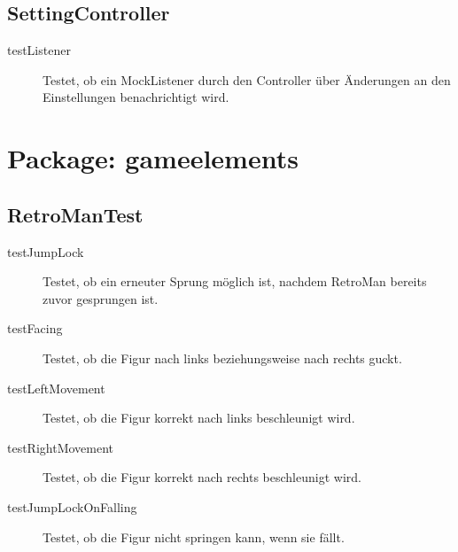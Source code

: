 \documentclass[parskip=full]{scrreprt}
\begin{document}
\subsection{SettingController}

\begin{description}
	\item [testListener] Testet, ob ein MockListener durch den Controller über Änderungen an den Einstellungen benachrichtigt wird.
\end{description}

\section{Package: gameelements}

\subsection{RetroManTest}

\begin{description}
	\item[testJumpLock] Testet, ob ein erneuter Sprung möglich ist, nachdem RetroMan bereits zuvor gesprungen ist.
	\item[testFacing] Testet, ob die Figur nach links beziehungsweise nach rechts guckt.
	\item[testLeftMovement] Testet, ob die Figur korrekt nach links beschleunigt wird.
	\item[testRightMovement] Testet, ob die Figur korrekt nach rechts beschleunigt wird.
	\item[testJumpLockOnFalling] Testet, ob die Figur nicht springen kann, wenn sie fällt.
\end{description}
\end{document}
